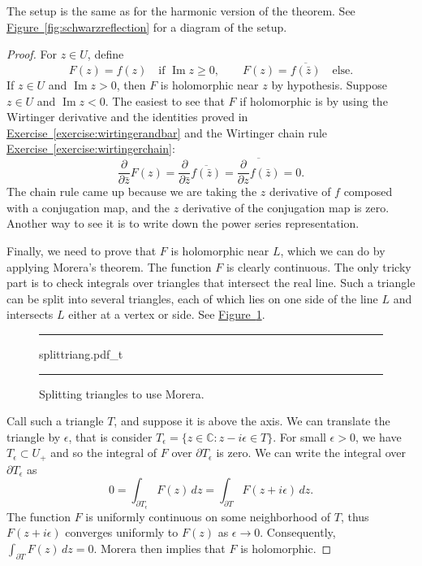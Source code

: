 \documentclass[12pt,openany]{book}
\renewcommand{\Im}{\operatorname{Im}}
\newcommand{\C}{{\mathbb{C}}}
\theoremstyle{plain}
\theoremstyle{remark}
\theoremstyle{definition}
\newenvironment{myfig}{%
\begin{figure}[h!t]
\noindent\rule{\textwidth}{0.5pt}\vspace{12pt}\par\centering}%
{\par\noindent\rule{\textwidth}{0.5pt}
\end{figure}}
\theoremstyle{exercise}
\theoremstyle{example}
\newcommand{\figureref}[1]{\hyperref[#1]{Figure~\ref*{#1}}}
\newcommand{\exerciseref}[1]{\hyperref[#1]{Exercise~\ref*{#1}}}
\begin{document}
The setup is the same as for the harmonic version of the theorem.
See \figureref{fig:schwarzreflection} for a diagram of the setup.

\begin{proof}
For $z \in U$, define
\begin{equation*}
F(z) =
f(z) \quad \text{if } \Im z \geq 0,
\qquad
F(z) =
\overline{f(\bar{z})} \quad \text{else} .
\end{equation*}
If $z \in U$ and $\Im z > 0$, then $F$ is holomorphic near $z$ by hypothesis.
Suppose $z \in U$ and $\Im z < 0$.  The easiest to see that $F$
if holomorphic is by using the Wirtinger derivative and the
identities proved in \exerciseref{exercise:wirtingerandbar} and
the Wirtinger chain rule \exerciseref{exercise:wirtingerchain}:
\begin{equation*}
\frac{\partial}{\partial \bar{z}}
F(z)
=
\frac{\partial}{\partial \bar{z}}
\overline{f(\bar{z})}
=
\overline{
\frac{\partial}{\partial z}
f(\bar{z})
}
=
0 .
\end{equation*}
The chain rule came up because we are taking the $z$ derivative of $f$
composed with a conjugation map, and the $z$ derivative of the conjugation
map is zero.
Another way to see it is to write down the power series representation.

Finally, we need to prove that $F$ is holomorphic near $L$,
which we can do by applying Morera's theorem.  The function $F$ is clearly
continuous.  The only
tricky part is to check integrals over
triangles that intersect the real line.  Such a triangle can be split into
several triangles, each of which lies on one side of the line $L$ and
intersects $L$ either at a vertex or side.  See \figureref{fig:splittriang}.

\begin{myfig}
{splittriang.pdf_t}
\caption{Splitting triangles to use Morera.\label{fig:splittriang}}
\end{myfig}

Call such a triangle $T$, and suppose it is above the axis.
We can translate the triangle by $\epsilon$, that is
consider $T_\epsilon = \{ z \in \C : z-i\epsilon \in T \}$.
For small $\epsilon > 0$, we have
$T_\epsilon \subset U_+$ and so
the integral of $F$ over $\partial T_\epsilon$
is zero.  We can write the integral over $\partial T_\epsilon$
as
\begin{equation*}
0 = \int_{\partial T_\epsilon} F(z) \, dz =
\int_{\partial T} F(z+i\epsilon) \, dz .
\end{equation*}
The function $F$ is uniformly continuous on some neighborhood of $T$,
thus $F(z+i\epsilon)$ converges uniformly to $F(z)$ as $\epsilon \to 0$.
Consequently, $\int_{\partial T} F(z) \, dz = 0$.
Morera then implies that $F$ is holomorphic.
\end{proof}
\end{document}
